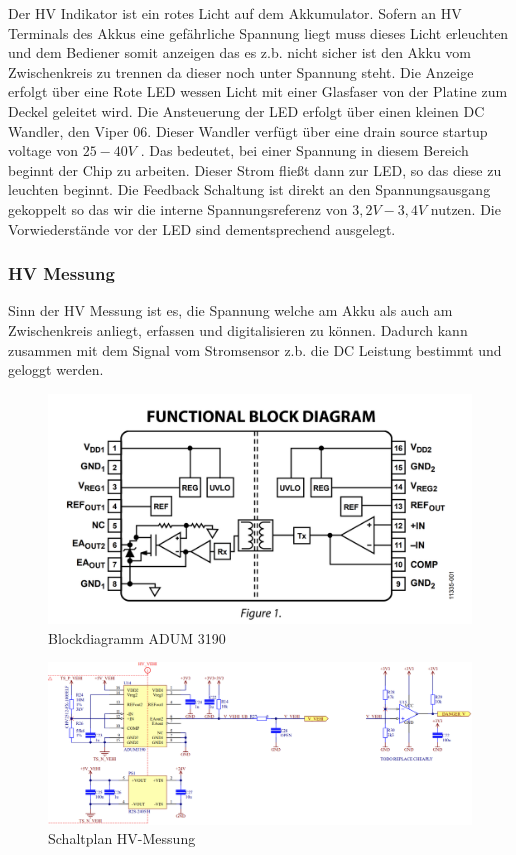 Der \ac{HV} Indikator ist ein rotes Licht auf dem Akkumulator. Sofern an \ac{HV} Terminals des Akkus eine gefährliche Spannung liegt muss dieses Licht erleuchten und dem Bediener somit anzeigen das es z.b. nicht sicher ist den Akku vom Zwischenkreis zu trennen da dieser noch unter Spannung steht. Die Anzeige erfolgt über eine Rote LED wessen Licht mit einer Glasfaser von der Platine zum Deckel geleitet wird. Die Ansteuerung der LED erfolgt über einen kleinen DC Wandler, den Viper 06. Dieser Wandler verfügt über eine drain source startup voltage von \ensuremath{25-40V} \cite{Viper06}. Das bedeutet, bei einer Spannung in diesem Bereich beginnt der Chip zu arbeiten. Dieser Strom fließt dann zur LED, so das diese zu leuchten beginnt. Die Feedback Schaltung ist direkt an den Spannungsausgang gekoppelt so das wir die interne Spannungsreferenz von \ensuremath{3,2 V - 3,4 V} nutzen. Die Vorwiederstände vor der LED sind dementsprechend ausgelegt.

\FloatBarrier
\subsubsection{\ac{HV} Messung}
Sinn der \ac{HV} Messung ist es, die Spannung welche am Akku als auch am Zwischenkreis anliegt, erfassen und digitalisieren zu können. Dadurch kann zusammen mit dem Signal vom Stromsensor z.b. die DC Leistung bestimmt und geloggt werden. 

\begin{figure}
	\centering
	\includegraphics[width=0.4\linewidth]{"bilder/Blockdiagramm ADUM3190"}
	\caption{Blockdiagramm ADUM 3190}
	\label{fig:blockdiagramm-adum3190}
\end{figure}

\begin{figure}
	\centering
	\includegraphics[width=0.9\linewidth]{bilder/HV_Measurement_PNG}
	\caption{Schaltplan \ac{HV}-Messung}
	\label{fig:hvmeasurementpng}
\end{figure}

